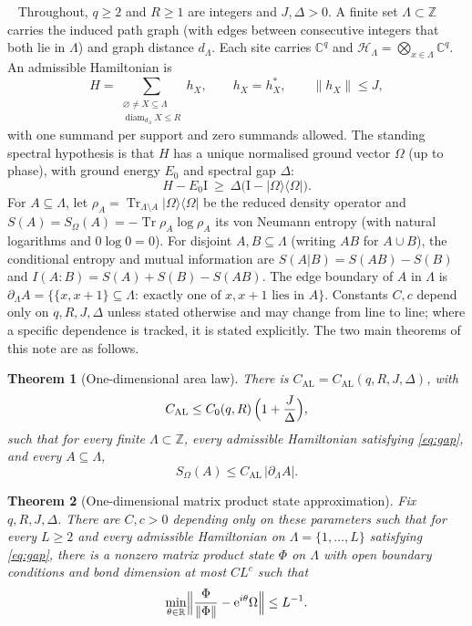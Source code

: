 \documentclass[aps,prx,reprint,superscriptaddress,floatfix,nofootinbib,longbibliography,amsmath,amssymb]{revtex4-2}
\newcommand{\C}{\mathbb C}
\newcommand{\R}{\mathbb R}
\newcommand{\Z}{\mathbb Z}
\newcommand{\id}{\mathrm{I}}
\newcommand{\Tr}{\operatorname{Tr}}
\newcommand{\diam}{\operatorname{diam}}
\newcommand{\norm}[1]{\lVert #1\rVert}
\newcommand{\abs}[1]{\lvert #1\rvert}
\providecommand{\ket}[1]{|#1\rangle}\renewcommand{\ket}[1]{|#1\rangle}
\providecommand{\bra}[1]{\langle #1|}\renewcommand{\bra}[1]{\langle #1|}
\newcommand{\cH}{\mathcal H}
\newcommand{\Om}{\Omega}
\newcommand{\Lam}{\Lambda}
\newcommand{\e}{\mathrm e}
\theoremstyle{plain}
\newtheorem{theorem}{Theorem}[section]
\theoremstyle{definition}
\newcommand{\precisely}{\par\noindent{\bfseries Precisely.}\ }
\begin{document}
\precisely
Throughout, $q\ge 2$ and $R\ge 1$ are integers and $J,\Delta>0$. A finite
set $\Lam\subset\Z$ carries the induced path graph (with edges between
consecutive integers that both lie in $\Lam$) and graph distance $d_\Lam$.
Each site carries $\C^q$ and $\cH_\Lam=\bigotimes_{x\in\Lam}\C^q$.
An admissible Hamiltonian is
\begin{equation}\label{eq:ham}
 H=\sum_{\substack{\varnothing\ne X\subseteq\Lam\\ \diam_{d_\Lam}X\le R}}h_X,
 \qquad h_X=h_X^*,\qquad \norm{h_X}\le J,
\end{equation}
with one summand per support and zero summands allowed. The standing
spectral hypothesis is that $H$ has a unique normalised ground vector $\Om$
(up to phase), with ground energy $E_0$ and spectral gap $\Delta$:
\begin{equation}\label{eq:gap}
 H-E_0\id\ \ge\ \Delta\bigl(\id-\ket\Om\bra\Om\bigr).
\end{equation}
For $A\subseteq\Lam$, let $\rho_A=\Tr_{\Lam\setminus A}\ket\Om\bra\Om$ be
the reduced density operator and $S(A)=S_\Om(A)=-\Tr\rho_A\log\rho_A$ its
von Neumann entropy (with natural logarithms and $0\log 0=0$). For
disjoint $A,B\subseteq\Lam$ (writing $AB$ for $A\cup B$), the conditional
entropy and mutual information are $S(A|B)=S(AB)-S(B)$ and
$I(A:B)=S(A)+S(B)-S(AB)$. The edge boundary of $A$ in $\Lam$ is
$\partial_\Lam A=\{\{x,x+1\}\subseteq\Lam:\ \text{exactly one of }x,x+1\text{ lies in }A\}$.
Constants $C,c$ depend only on $q,R,J,\Delta$ unless stated otherwise and
may change from line to line; where a specific dependence is tracked, it
is stated explicitly. The two main theorems of this note are as follows.

\begin{theorem}[One-dimensional area law]\label{thm:A}
There is $C_{\mathrm{AL}}=C_{\mathrm{AL}}(q,R,J,\Delta)$, with
\[
 C_{\mathrm{AL}}\le C_0(q,R)\,\Bigl(1+\frac J\Delta\Bigr),
\]
such that for every finite $\Lam\subset\Z$, every admissible Hamiltonian
satisfying \eqref{eq:gap}, and every $A\subseteq\Lam$,
\[
 S_\Om(A)\le C_{\mathrm{AL}}\,\abs{\partial_\Lam A}.
\]
\end{theorem}

\begin{theorem}[One-dimensional matrix product state approximation]\label{thm:B}
Fix $q,R,J,\Delta$. There are $C,c>0$ depending only on these parameters
such that for every $L\ge2$ and every admissible Hamiltonian on
$\Lam=\{1,\dots,L\}$ satisfying \eqref{eq:gap}, there is a nonzero matrix
product state $\Phi$ on $\Lam$ with open boundary conditions and bond
dimension at most $CL^{c}$ such that
\[
 \min_{\theta\in\R}\Bigl\|\frac{\Phi}{\norm\Phi}-\e^{i\theta}\Om\Bigr\|\le L^{-1}.
\]
\end{theorem}
\end{document}
